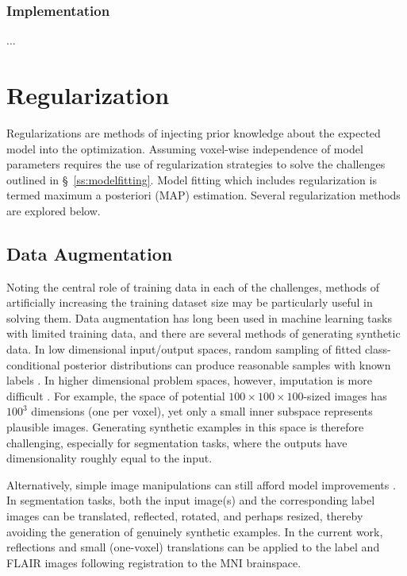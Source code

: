 \subsubsection{Implementation}
\par...\par
\section{Regularization}\label{s:reg-method}
Regularizations are methods of injecting prior knowledge about the expected model into the optimization. Assuming voxel-wise independence of model parameters requires the use of regularization strategies to solve the challenges outlined in \S\ \ref{ss:modelfitting}. Model fitting which includes regularization is termed maximum a posteriori (MAP) estimation. Several regularization methods are explored below.
\subsection{Data Augmentation}
Noting the central role of training data in each of the challenges, methods of artificially increasing the training dataset size may be particularly useful in solving them. Data augmentation has long been used in machine learning tasks with limited training data, and there are several methods of generating synthetic data. In low dimensional input/output spaces, random sampling of fitted class-conditional posterior distributions can produce reasonable samples with known labels \cite{Tanner1987}. In higher dimensional problem spaces, however, imputation is more difficult \cite{Goodfellow2014}. For example, the space of potential $100\times100\times100$-sized images has $100^3$ dimensions (one per voxel), yet only a small inner subspace represents plausible images. Generating synthetic examples in this space is therefore challenging, especially for segmentation tasks, where the outputs have dimensionality roughly equal to the input.
\par
Alternatively, simple image manipulations can still afford model improvements \cite{Krizhevsky2012}. In segmentation tasks, both the input image(s) and the corresponding label images can be translated, reflected, rotated, and perhaps resized, thereby avoiding the generation of genuinely synthetic examples. In the current work, reflections and small (one-voxel) translations can be applied to the label and FLAIR images following registration to the MNI brainspace.
